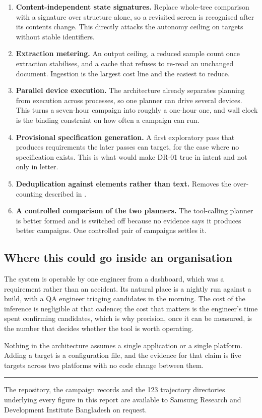 \begin{enumerate}[leftmargin=2.0em,itemsep=4pt]
  \item \textbf{Content-independent state signatures.} Replace whole-tree
    comparison with a signature over structure alone, so a revisited screen is
    recognised after its contents change. This directly attacks the autonomy
    ceiling on targets without stable identifiers.
  \item \textbf{Extraction metering.} An output ceiling, a reduced sample count
    once extraction stabilises, and a cache that refuses to re-read an
    unchanged document. Ingestion is the largest cost line and the easiest to
    reduce.
  \item \textbf{Parallel device execution.} The architecture already separates
    planning from execution across processes, so one planner can drive several
    devices. This turns a seven-hour campaign into
    roughly a one-hour one, and wall clock is the binding constraint on how
    often a campaign can run.
  \item \textbf{Provisional specification generation.} A first exploratory pass
    that produces requirements the later passes can target, for the case where
    no specification exists. This is what would make DR-01 true in intent and
    not only in letter.
  \item \textbf{Deduplication against elements rather than text.} Removes the
    over-counting described in .
  \item \textbf{A controlled comparison of the two planners.} The tool-calling
    planner is better formed and is switched off because no evidence says it
    produces better campaigns. One controlled pair of campaigns settles it.
\end{enumerate}

\subsection{Where this could go inside an organisation}

The system is operable by one engineer from a dashboard, which was a
requirement rather than an accident. Its natural place is a nightly run against
a build, with a QA engineer triaging candidates in the morning. The cost of the
inference is negligible at that cadence; the cost that matters is the
engineer's time spent confirming candidates, which is why precision, once it
can be measured, is the number that decides whether the tool is worth
operating.

Nothing in the architecture assumes a single application or a single platform.
Adding a target is a configuration file, and the evidence for that claim is
five targets across two platforms with no code change between them.

\vspace{10pt}
\noindent\rule{\textwidth}{0.4pt}

\vspace{4pt}
\noindent\footnotesize The repository, the campaign records and the 123
trajectory directories underlying every figure in this report are available to
Samsung Research and Development Institute Bangladesh on request.
